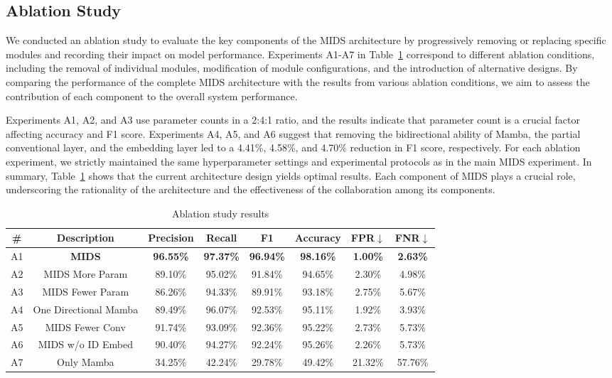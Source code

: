 \documentclass[lettersize,journal]{IEEEtran}
\begin{document}
\subsection{Ablation Study}
\label{subsec:ablation}
We conducted an ablation study to evaluate the key components of the MIDS architecture by progressively removing or replacing specific modules and recording their impact on model performance. Experiments A1-A7 in Table~\ref{tab5} correspond to different ablation conditions, including the removal of individual modules, modification of module configurations, and the introduction of alternative designs. By comparing the performance of the complete MIDS architecture with the results from various ablation conditions, we aim to assess the contribution of each component to the overall system performance.

Experiments A1, A2, and A3 use parameter counts in a 2:4:1 ratio, and the results indicate that parameter count is a crucial factor affecting accuracy and F1 score. Experiments A4, A5, and A6 suggest that removing the bidirectional ability of Mamba, the partial conventional layer, and the embedding layer led to a 4.41\%, 4.58\%, and 4.70\% reduction in F1 score, respectively. For each ablation experiment, we strictly maintained the same hyperparameter settings and experimental protocols as in the main MIDS experiment.
In summary, Table~\ref{tab5} shows that the current architecture design yields optimal results. Each component of MIDS plays a crucial role, underscoring the rationality of the architecture and the effectiveness of the collaboration among its components.
\begin{table}[!ht]
\caption{Ablation study results}
\label{tab5}
\begin{center}
\renewcommand{\arraystretch}{1.2} %
\begin{tabular}{cccccccc} 
\hline
\textbf{\#} & \textbf{Description} & \textbf{Precision} & \textbf{Recall} & \textbf{F1} & \textbf{Accuracy} & \textbf{FPR}\(\downarrow\) & \textbf{FNR}\(\downarrow\) \\
\hline
A1 & \textbf{MIDS} & \textbf{96.55\%} & \textbf{97.37\%} & \textbf{96.94\%} & \textbf{98.16\%} & \textbf{1.00\%} & \textbf{2.63\%} \\
A2 & MIDS More Param & 89.10\% & 95.02\% & 91.84\% & 94.65\% & 2.30\% & 4.98\% \\
A3 & MIDS Fewer Param & 86.26\% & 94.33\% & 89.91\% & 93.18\% & 2.75\% & 5.67\% \\
A4 & One Directional Mamba & 89.49\% & 96.07\% & 92.53\% & 95.11\% & 1.92\% & 3.93\% \\
A5 & MIDS Fewer Conv      & 91.74\% & 93.09\% & 92.36\% & 95.22\% & 2.73\% & 5.73\% \\
A6 & MIDS w/o ID Embed & 90.40\% & 94.27\% & 92.24\% & 95.26\% & 2.26\% & 5.73\% \\
A7 & Only Mamba           & 34.25\% & 42.24\% & 29.78\% & 49.42\% & 21.32\% & 57.76\% \\
\hline
\end{tabular}
\end{center}
\end{table}
\end{document}
